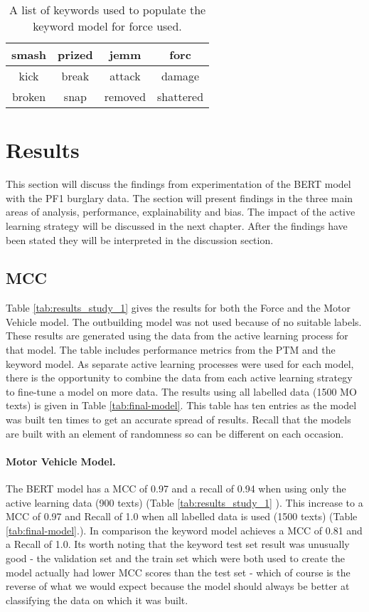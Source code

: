 \begin{table}[]
\begin{tabular}{|c|c|c|c|}
\hline
smash  & prized & jemm    & forc      \\ \hline
kick   & break  & attack  & damage    \\ \hline
broken & snap   & removed & shattered \\ \hline
\end{tabular}
\caption[Keywords for keyword model - force used]{\label{tab:Keywords_force} A list of keywords used to populate the keyword model for force used.}
\end{table}


\section{Results} This section will discuss the findings from experimentation of the BERT model with the PF1 burglary data. The section will present findings in the three main areas of analysis, performance, explainability and bias. The impact of the active learning strategy will be discussed in the next chapter. After the findings have been stated they will be interpreted in the discussion section.



\subsection{MCC} Table \ref{tab:results_study_1} gives the results for both the Force and the Motor Vehicle model. The outbuilding model was not used because of no suitable labels. These results are generated using the data from the active learning process for that model. The table includes performance metrics from the PTM and the keyword model. As separate active learning processes were used for each model, there is the opportunity to combine the data from each active learning strategy to fine-tune a model on more data. The results using all labelled data (1500 MO texts) is given in Table \ref{tab:final-model}. This table has ten entries as the model was built ten times to get an accurate spread of results. Recall that the models are built with an element of randomness so can be different on each occasion.

\paragraph{Motor Vehicle Model.} The BERT model has a MCC of 0.97 and a recall of 0.94 when using only the active learning data (900 texts) (Table \ref{tab:results_study_1} ). This increase to a MCC of 0.97 and Recall of 1.0 when all labelled data is used (1500 texts) (Table \ref{tab:final-model}.). In comparison the keyword model achieves a MCC of 0.81 and a Recall of 1.0. Its worth noting that the keyword test set result was unusually good - the validation set and the train set which were both used to create the model actually had lower MCC scores than the test set - which of course is the reverse of what we would expect because the model should always be better at classifying the data on which it was built.

